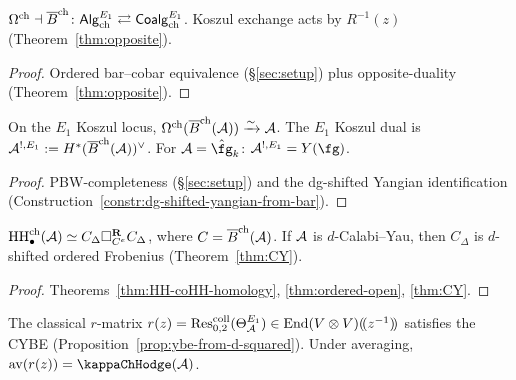 \begin{theorem}
\label{thm:e1-theorem-A}
$\Omega^{\mathrm{ch}} \dashv \overline{B}^{\mathrm{ch}}\colon
\mathsf{Alg}^{E_1}_{\mathrm{ch}} \rightleftarrows
\mathsf{Coalg}^{E_1}_{\mathrm{ch}}$.
Koszul exchange acts by $R^{-1}(z)$
\textup{(}Theorem~\textup{\ref{thm:opposite}}).
\end{theorem}

\begin{proof}
Ordered bar--cobar equivalence (\S\ref{sec:setup}) plus
opposite-duality (Theorem~\ref{thm:opposite}).
\end{proof}

\begin{theorem}
\label{thm:e1-theorem-B}
On the $E_1$ Koszul locus,
$\Omega^{\mathrm{ch}}(\overline{B}^{\mathrm{ch}}(\mathcal{A})) \xrightarrow{\sim} \mathcal{A}$.
The $E_1$ Koszul dual is
$\mathcal{A}^{!,E_1} := H^*(\overline{B}^{\mathrm{ch}}(\mathcal{A}))^\vee$.
For $\cA = \hat\fg_k$:
$\cA^{!,E_1} = Y(\fg)$.
\end{theorem}

\begin{proof}
PBW-completeness (\S\ref{sec:setup}) and the dg-shifted Yangian
identification
(Construction~\ref{constr:dg-shifted-yangian-from-bar}).
\end{proof}

\begin{theorem}
\label{thm:e1-theorem-C}
$\operatorname{HH}^{\mathrm{ch}}_\bullet(\mathcal{A})
\simeq
C_\Delta \square_{C^e}^{\mathbf{R}} C_\Delta$,
where $C = \overline{B}^{\mathrm{ch}}(\mathcal{A})$.
If $\mathcal{A}$ is $d$-Calabi--Yau, then $C_\Delta$ is
$d$-shifted ordered Frobenius
\textup{(}Theorem~\textup{\ref{thm:CY}}).
\end{theorem}

\begin{proof}
Theorems~\ref{thm:HH-coHH-homology}, \ref{thm:ordered-open},
\ref{thm:CY}.
\end{proof}

\begin{theorem}
\label{thm:e1-theorem-D}
The classical $r$-matrix
$r(z) = \operatorname{Res}^{\mathrm{coll}}_{0,2}(\Theta_{\mathcal{A}}^{E_1})
\in \operatorname{End}(V \otimes V)(\!(z^{-1})\!)$
satisfies the CYBE
\textup{(}Proposition~\textup{\ref{prop:ybe-from-d-squared}}).
Under averaging,
$\operatorname{av}(r(z)) = \kappaChHodge(\cA)$.
\end{theorem}

